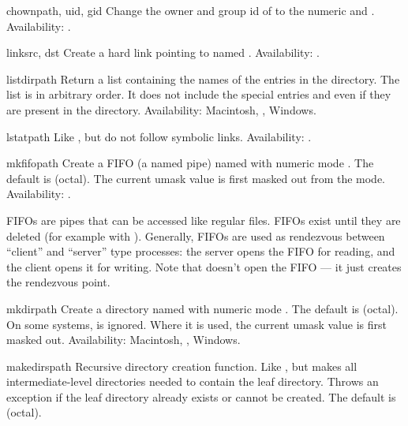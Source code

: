 \begin{funcdesc}{chown}{path, uid, gid}
Change the owner and group id of  to the numeric 
and .
Availability: \UNIX{}.
\end{funcdesc}

\begin{funcdesc}{link}{src, dst}
Create a hard link pointing to  named .
Availability: \UNIX{}.
\end{funcdesc}

\begin{funcdesc}{listdir}{path}
Return a list containing the names of the entries in the directory.
The list is in arbitrary order.  It does not include the special
entries  and  even if they are present in the
directory.
Availability: Macintosh, \UNIX{}, Windows.
\end{funcdesc}

\begin{funcdesc}{lstat}{path}
Like , but do not follow symbolic links.
Availability: \UNIX{}.
\end{funcdesc}

\begin{funcdesc}{mkfifo}{path}
Create a FIFO (a named pipe) named  with numeric mode
.  The default  is  (octal).  The current
umask value is first masked out from the mode.
Availability: \UNIX{}.

FIFOs are pipes that can be accessed like regular files.  FIFOs exist
until they are deleted (for example with ).
Generally, FIFOs are used as rendezvous between ``client'' and
``server'' type processes: the server opens the FIFO for reading, and
the client opens it for writing.  Note that 
doesn't open the FIFO --- it just creates the rendezvous point.
\end{funcdesc}

\begin{funcdesc}{mkdir}{path}
Create a directory named  with numeric mode .
The default  is  (octal).  On some systems,
 is ignored.  Where it is used, the current umask value is
first masked out.
Availability: Macintosh, \UNIX{}, Windows.
\end{funcdesc}

\begin{funcdesc}{makedirs}{path}
Recursive directory creation function.  Like ,
but makes all intermediate-level directories needed to contain the
leaf directory.  Throws an  exception if the leaf
directory already exists or cannot be created.  The default 
is  (octal).
\end{funcdesc}

